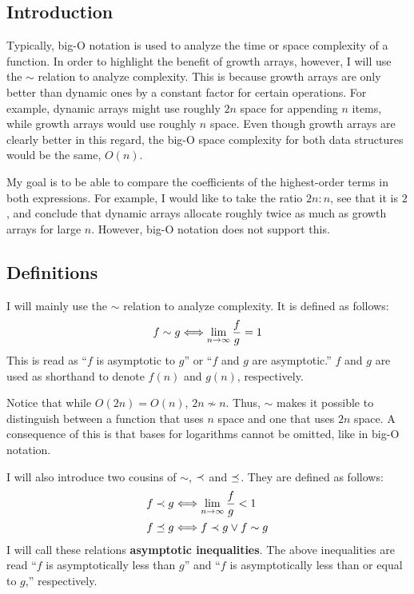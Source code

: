 \subsection{Introduction}

Typically, big-O notation is used to analyze the time or space complexity of a function. In order to highlight the benefit of growth arrays, however, I will use the $\sim$ relation to analyze complexity. This is because growth arrays are only better than dynamic ones by a constant factor for certain operations. For example, dynamic arrays might use roughly $2n$ space for appending $n$ items, while growth arrays would use roughly $n$ space. Even though growth arrays are clearly better in this regard, the big-O space complexity for both data structures would be the same, $O(n)$.

My goal is to be able to compare the coefficients of the highest-order terms in both expressions. For example, I would like to take the ratio $2n : n$, see that it is $2$, and conclude that dynamic arrays allocate roughly twice as much as growth arrays for large $n$. However, big-O notation does not support this.

\subsection{Definitions}

I will mainly use the $\sim$ relation to analyze complexity. It is defined as follows:
\begin{align*}
f \sim g \Longleftrightarrow \lim_{n \to \infty} \frac f g = 1
\end{align*}
This is read as ``$f$ is asymptotic to $g$'' or ``$f$ and $g$ are asymptotic.'' {\HdrNote} $f$ and $g$ are used as shorthand to denote $f(n)$ and $g(n)$, respectively.

Notice that while $O(2n) = O(n)$, $2n \not\sim n$. Thus, $\sim$ makes it possible to distinguish between a function that uses $n$ space and one that uses $2n$ space. {\HdrNote} A consequence of this is that bases for logarithms cannot be omitted, like in big-O notation.

I will also introduce two cousins of $\sim$, $\prec$ and $\preceq$. They are defined as follows:
\begin{align*}
f \prec g &\Longleftrightarrow \lim_{n \to \infty} \frac f g < 1\\
f \preceq g &\Longleftrightarrow f \prec g \lor f \sim g
\end{align*}
I will call these relations \textbf{asymptotic inequalities}. The above inequalities are read ``$f$ is asymptotically less than $g$'' and ``$f$ is asymptotically less than or equal to $g$,'' respectively.

